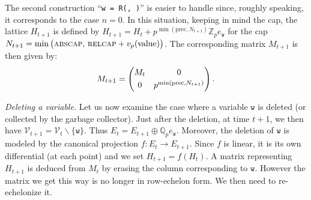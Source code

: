 \documentclass[sigconf]{acmart}
\newcommand{\Z}{\mathbb Z}
\newcommand{\Zp}{\Z_p}
\newcommand{\Q}{\mathbb Q}
\newcommand{\Qp}{\Q_p}
\newcommand{\calV}{\mathcal{V}}
\newcommand{\ttw}{\texttt{w}\xspace}
\theoremstyle{definition}
\begin{document}
\smallskip

The second construction
``\verb?w = ?\verb?R(?\verb?, ?\verb?)?''
is easier to handle since, roughly speaking, it corresponds to the
case $n = 0$.
In this situation, keeping in mind the cap, the lattice $H_{t+1}$ is 
defined by
$H_{t+1} = H_t + p^{\min(\text{prec}, N_{t+1})} \Zp e_\ttw$
for the cap
$N_{t+1} = \min\big(\textsc{abscap},\, \textsc{relcap} + 
v_p(\text{value})\big)$.
The corresponding matrix $M_{t+1}$ is then given by:
$$M_{t+1} = \left(\begin{matrix}
M_t & 0 \smallskip \\ 0 & p^{\min(\text{prec}, N_{t+1})}
\end{matrix}\right).$$

\smallskip

\noindent \textit{Deleting a variable.}
%
Let us now examine the case where a variable $\ttw$ is deleted (or 
collected by the garbage collector). Just after the deletion, at
time $t{+}1$, we then have $\calV_{t+1} = \calV_t \backslash \{\ttw\}$.
Thus $E_t = E_{t+1} \oplus \Qp e_\ttw$. Moreover, the deletion of $\ttw$
is modeled by the canonical projection $f : E_t \to E_{t+1}$. Since $f$
is linear, it is its own differential (at each point) and we set 
$H_{t+1} = f(H_t)$.
A matrix representing $H_{t+1}$ is deduced from $M_t$ by erasing the 
column corresponding to $\ttw$. However the matrix we get this way is 
no longer in row-echelon form. We then need to re-echelonize it.
\end{document}
